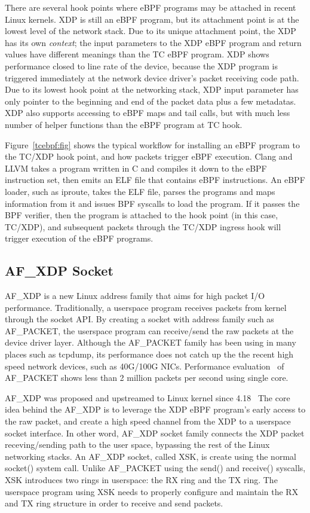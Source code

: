 \documentclass[10pt]{sigplanconf}
\begin{document}
There are several hook points where eBPF programs may be attached in recent
Linux kernels. XDP is still an eBPF program, but its attachment point is at the
lowest level of the network stack.  Due to its unique attachment point, the XDP
has its own {\em context}; the input parameters to the XDP eBPF program and return
values have different meanings than the TC eBPF program. XDP shows performance
closed to line rate of the device, because the XDP program is triggered immediately
at the network device driver's packet receiving code path.
Due to its lowest hook point at the networking stack, XDP input parameter has only
pointer to the beginning and end of the packet data plus a few metadatas.
XDP also supports accessing to eBPF maps and tail calls, but with much
less number of helper functions than the eBPF program at TC hook.

Figure~\ref{tcebpf:fig}
shows the typical workflow for installing an eBPF program to the TC/XDP hook point,
and how packets trigger eBPF execution.  Clang and LLVM takes a program
written in C and compiles it down to the eBPF instruction set, then emits an
ELF file that contains eBPF instructions.  An eBPF loader, such as iproute,
takes the ELF file, parses the programs and maps information from it and
issues BPF syscalls to load the program.  If it passes the BPF verifier,
then the program is attached to the hook point (in this case, TC/XDP), and
subsequent packets through the TC/XDP ingress hook will trigger execution of the
eBPF programs.

\subsection{AF\_XDP Socket}
AF\_XDP is a new Linux address family that aims for high packet I/O
performance. Traditionally, a userspace program receives packets from
kernel through the socket API.  By creating a socket with address family
such as AF\_PACKET, the userspace program can receive/send the raw packets
at the device driver layer.  Although the AF\_PACKET family has been using
in many places such as tcpdump, its performance does not catch up the the
recent high speed network devices, such as 40G/100G NICs.
Performance evaluation~\cite{danialafpacket,johnafxdp} of AF\_PACKET
shows less than 2 million packets per second using single core.

AF\_XDP was proposed and upstreamed to Linux kernel since 4.18~\cite{afxdp} 
The core idea behind the AF\_XDP is to leverage the XDP eBPF program's
early access to the raw packet, and create a high speed channel from the XDP to
a userspace socket interface. In other word, AF\_XDP socket family connects the
XDP packet receving/sending path to the user space, bypassing the rest of the
Linux networking stacks.
An AF\_XDP socket, called XSK, is create using the normal socket() system
call. Unlike AF\_PACKET using the send() and receive() syscalls,
XSK introduces two rings in userspace: the RX ring and the TX ring.
The userspace program using XSK needs to properly configure and maintain
the RX and TX ring structure in order to receive and send packets.
\end{document}
